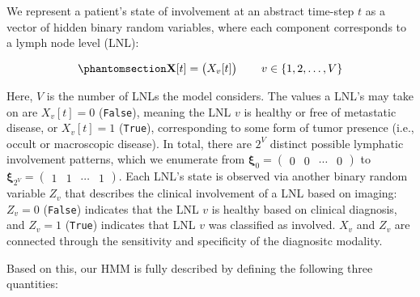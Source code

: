 \documentclass[
  sn-mathphys-num,
]{sn-jnl}
\begin{document}
We represent a patient's state of involvement at an abstract time-step
\(t\) as a vector of hidden binary random variables, where each
component corresponds to a lymph node level (LNL):

\begin{equation}\phantomsection\label{eq-state-def}{
\mathbf{X}[t] = \begin{pmatrix} X_v[t] \end{pmatrix} \qquad v \in \left\{ 1, 2, \ldots, V \right\}
}\end{equation}

Here, \(V\) is the number of LNLs the model considers. The values a
LNL's may take on are \(X_v[t] = 0\) (\texttt{False}), meaning the LNL
\(v\) is healthy or free of metastatic disease, or \(X_v[t] = 1\)
(\texttt{True}), corresponding to some form of tumor presence (i.e.,
occult or macroscopic disease). In total, there are \(2^V\) distinct
possible lymphatic involvement patterns, which we enumerate from
\(\boldsymbol{\xi}_0 = \begin{pmatrix} 0 & 0 & \cdots & 0 \end{pmatrix}\)
to
\(\boldsymbol{\xi}_{2^V} = \begin{pmatrix} 1 & 1 & \cdots & 1 \end{pmatrix}\).
Each LNL's state is observed via another binary random variable \(Z_v\)
that describes the clinical involvement of a LNL based on imaging:
\(Z_v = 0\) (\texttt{False}) indicates that the LNL \(v\) is healthy
based on clinical diagnosis, and \(Z_v = 1\) (\texttt{True}) indicates
that LNL \(v\) was classified as involved. \(X_v\) and \(Z_v\) are
connected through the sensitivity and specificity of the diagnositc
modality.

Based on this, our HMM is fully described by defining the following
three quantities:
\end{document}
